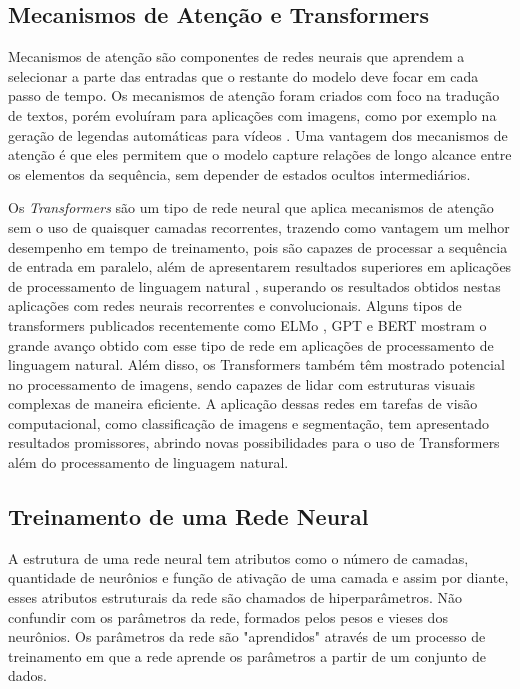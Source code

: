 \subsection{Mecanismos de Atenção e Transformers}\label{subsec:cap_fundamentos_attention_transformers}

Mecanismos de atenção \cite{bahdanu2014} são componentes de redes neurais que aprendem a selecionar a parte das entradas que o restante do modelo deve focar em cada passo de tempo. Os mecanismos de atenção foram criados com foco na tradução de textos, porém evoluíram para aplicações com imagens, como por exemplo na geração de legendas automáticas para vídeos \cite{xu2015show}. Uma vantagem dos mecanismos de atenção é que eles permitem que o modelo capture relações de longo alcance entre os elementos da sequência, sem depender de estados ocultos intermediários.

Os \textit{Transformers} \cite{vaswani2017attention} são um tipo de rede neural que aplica mecanismos de atenção sem o uso de quaisquer camadas recorrentes, trazendo como vantagem um melhor desempenho em tempo de treinamento, pois são capazes de processar a sequência de entrada em paralelo, além de apresentarem resultados superiores em aplicações de processamento de linguagem natural \cite{wolf2016transformers}, superando os resultados obtidos nestas aplicações com redes neurais recorrentes e convolucionais. Alguns tipos de transformers publicados recentemente como ELMo \cite{Peters2018DeepRepresentations}, GPT \cite{radford2018improving} e BERT \cite{devlin2018bert} mostram o grande avanço obtido com esse tipo de rede em aplicações de processamento de linguagem natural. Além disso, os Transformers também têm mostrado potencial no processamento de imagens, sendo capazes de lidar com estruturas visuais complexas de maneira eficiente. A aplicação dessas redes em tarefas de visão computacional, como classificação de imagens e segmentação, tem apresentado resultados promissores, abrindo novas possibilidades para o uso de Transformers além do processamento de linguagem natural.
    
\subsection{Treinamento de uma Rede Neural}\label{subsec:cap_fundamentos_treinamento_ann}

A estrutura de uma rede neural tem atributos como o número de camadas, quantidade de neurônios e função de ativação de uma camada e assim por diante, esses atributos estruturais da rede são chamados de hiperparâmetros. Não confundir com os parâmetros da rede, formados pelos pesos e vieses dos neurônios. Os parâmetros da rede são "aprendidos" através de um processo de treinamento em que a rede aprende os parâmetros a partir de um conjunto de dados.

